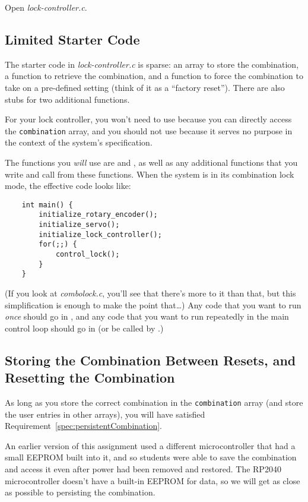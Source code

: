 Open \textit{lock-controller.c}.

\subsection{Limited Starter Code}

The starter code in \textit{lock-controller.c} is sparse:
an array to store the combination, a function to retrieve the combination, and a function to force the combination to take on a pre-defined setting (think of it as a ``factory reset'').
There are also stubs for two additional functions.

For your lock controller, you won't need to use  because you can directly access the \lstinline{combination} array,
and you should not use  because it serves no purpose in the context of the system's specification.

The functions you \textit{will} use are  and , as well as any additional functions that you write and call from these functions.
When the system is in its combination lock mode, the effective  code looks like:
\begin{lstlisting}
    int main() {
        initialize_rotary_encoder();
        initialize_servo();
        initialize_lock_controller();
        for(;;) {
            control_lock();
        }
    }
\end{lstlisting}
(If you look at \textit{combolock.c}, you'll see that there's more to it than that, but this simplification is enough to make the point that\dots)
Any code that you want to run \textit{once} should go in , and any code that you want to run repeatedly in the main control loop should go in  (or be called by .)


\subsection{Storing the Combination Between Resets, and Resetting the Combination}

As long as you store the correct combination in the \lstinline{combination} array (and store the user entries in other arrays), you will have satisfied Requirement~\ref{spec:persistentCombination}.

An earlier version of this assignment used a different microcontroller that had a small EEPROM built into it, and so students were able to save the combination and access it even after power had been removed and restored.
The RP2040 microcontroller doesn't have a built-in EEPROM for data, so we will get as close as possible to persisting the combination.

